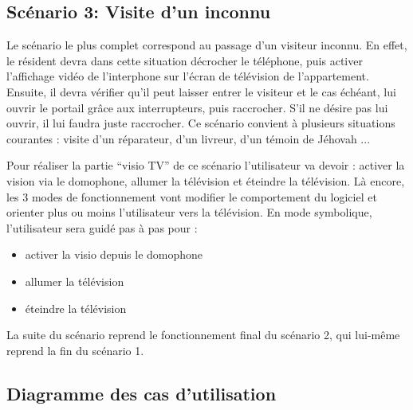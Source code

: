 \subsection{Scénario 3: Visite d'un inconnu}

Le scénario le plus complet correspond au passage d'un visiteur inconnu. En effet, le résident devra dans cette situation décrocher le téléphone, puis activer l'affichage vidéo de l'interphone sur l'écran de télévision de l'appartement. Ensuite, il devra vérifier qu'il peut laisser entrer le visiteur et le cas échéant, lui ouvrir le portail grâce aux interrupteurs, puis raccrocher. S'il ne désire pas lui ouvrir, il lui faudra juste raccrocher.
Ce scénario convient à plusieurs situations courantes : visite d'un réparateur, d'un livreur, d'un témoin de Jéhovah ...

Pour réaliser la partie "`visio TV"' de ce scénario l'utilisateur va devoir : activer la vision via le domophone, allumer la télévision et éteindre la télévision. Là encore, les 3 modes de fonctionnement vont modifier le comportement du logiciel et orienter plus ou moins l'utilisateur vers la télévision. En mode symbolique, l'utilisateur sera guidé pas à pas pour : 
\begin{itemize}
	\item activer la visio depuis le domophone
	\item allumer la télévision
	\item éteindre la télévision
\end{itemize}
La suite du scénario reprend le fonctionnement final du scénario 2, qui lui-même reprend la fin du scénario 1.

\subsection{Diagramme des cas d'utilisation}

